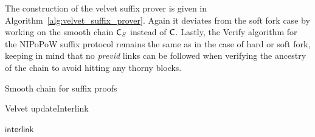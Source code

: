 The construction of the velvet suffix prover is given in Algorithm~\ref{alg:velvet_suffix_prover}. Again it deviates from the soft fork case by working on the smooth chain $\mathsf{C}_S$ instead of $\mathsf{C}$.
Lastly, the Verify algorithm for the NIPoPoW suffix protocol remains the same as in the case of hard or soft fork, keeping in mind that no \emph{previd} links can be followed when verifying the ancestry of the chain to avoid hitting any thorny blocks.

\begin{algorithm}[h!]
	\caption{\label{alg:smooth_chain_suffix}Smooth chain for suffix proofs}
	\begin{algorithmic}[1]
						\EndIf
				\EndWhile
				\State{}
			\EndFunction

					\State\Return{$\true$}
				\EndIf
							\State\Return{$\false$}
						\EndIf
				\EndFor
				\State\Return{$\true$}
			\EndFunction

							\State\Return{$\false$}
						\EndIf
							\State\Return{$\false$}
						\EndIf
				\EndWhile
				\State{}
			\EndFunction
	\end{algorithmic}
\end{algorithm}

\begin{algorithm}[h!]
		\caption{\label{alg:update_interlink}Velvet updateInterlink}
		\begin{algorithmic}[1]
						\EndFor
						\State\Return$\textsf{interlink}$
				\EndFunction
		\end{algorithmic}
\end{algorithm}

